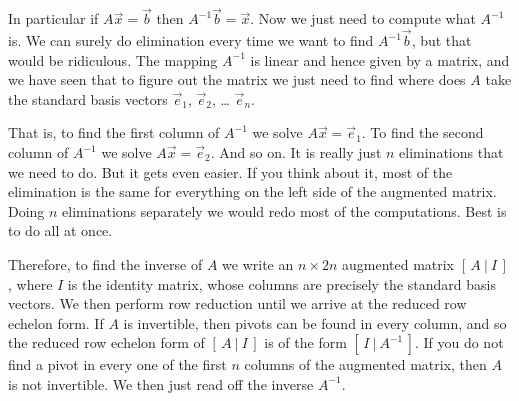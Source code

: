 In particular if $A \vec{x} = \vec{b}$ then $A^{-1} \vec{b} = \vec{x}$.
Now we just need to compute what $A^{-1}$ is.  We can surely 
do elimination every time we want to find $A^{-1} \vec{b}$, but that
would be ridiculous.  The mapping $A^{-1}$ is linear and
hence given by a matrix, and we have seen that to figure out the matrix
we just need to find where does $A$ take the standard basis vectors
$\vec{e}_1$, 
$\vec{e}_2$, \ldots
$\vec{e}_n$.

That is, to find the first column of $A^{-1}$ we solve
$A \vec{x} = \vec{e}_1$.
To find the second column of $A^{-1}$ we solve
$A \vec{x} = \vec{e}_2$.  And so on.  It is really just $n$
eliminations that we need to do.  But it gets even easier.
If you think about it, most of the elimination is the same for
everything on the left side of the augmented matrix.  Doing
$n$ eliminations separately we would redo most of the computations.
Best is to do all at once.

Therefore, to find the inverse of $A$ we write an $n
\times 2n$ augmented matrix $[ \,A ~|~ I\, ]$, where $I$ is the identity
matrix, whose columns are precisely the standard basis vectors.
We then perform row reduction until we arrive at the reduced row echelon
form.  If $A$ is invertible, then pivots can be found in every column,
and so the 
reduced row echelon form of $[ \,A ~|~ I\, ]$ 
is of the form $[ \,I ~|~ A^{-1}\, ]$.  If you do not find a pivot in every
one of the first $n$ columns of the augmented matrix, then 
$A$ is not invertible.  We then just read off the inverse $A^{-1}$.

